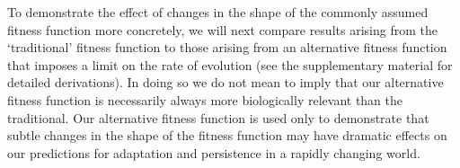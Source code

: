 \documentclass[12pt,letterpaper]{article} %
\begin{document}

To demonstrate the effect of changes in the shape of the commonly assumed fitness function more concretely, we will next compare results arising from the `traditional' fitness function to those arising from an alternative fitness function that imposes a limit on the rate of evolution (see the supplementary material for detailed derivations).
In doing so we do not mean to imply that our alternative fitness function is necessarily always more biologically relevant than the traditional.
Our alternative fitness function is used only to demonstrate that subtle changes in the shape of the fitness function may have dramatic effects on our predictions for adaptation and persistence in a rapidly changing world.

\end{document}
